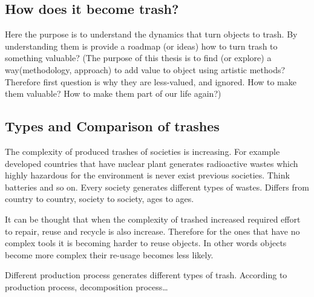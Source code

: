  \cite{zubiaurre2015trash}

\subsection{How does it become trash?}
Here the purpose is to understand the dynamics that turn objects to trash. By understanding them is provide a roadmap (or ideas) how to turn trash to something valuable? (The purpose of this thesis is to find (or explore) a way(methodology, approach) to add value to object using artistic methods? Therefore first question is why they are less-valued, and ignored. How to make them valuable? How to make them part of our life again?)

\subsection{Types and Comparison of trashes}
The complexity of produced trashes of societies is increasing. For example developed countries that have nuclear plant generates radioactive wastes which highly hazardous for the environment is never exist previous societies. Think batteries and so on. Every society generates different types of wastes. Differs from country to country, society to society, ages to ages.

It can be thought that when the complexity of trashed increased required effort to repair, reuse and recycle is also increase. Therefore for the ones that have no complex tools it is becoming harder to reuse objects. In other words objects become more complex their re-usage becomes less likely. 

Different production process generates different types of trash. According to production process, decomposition process\ldots

